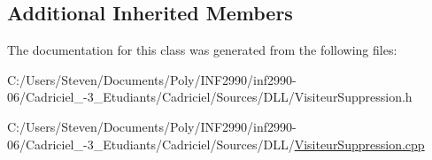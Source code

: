 \subsection*{Additional Inherited Members}


The documentation for this class was generated from the following files\+:\begin{DoxyCompactItemize}
\item 
C\+:/\+Users/\+Steven/\+Documents/\+Poly/\+I\+N\+F2990/inf2990-\/06/\+Cadriciel\+\_-\/3\+\_\+\+Etudiants/\+Cadriciel/\+Sources/\+D\+L\+L/Visiteur\+Suppression.\+h\item 
C\+:/\+Users/\+Steven/\+Documents/\+Poly/\+I\+N\+F2990/inf2990-\/06/\+Cadriciel\+\_-\/3\+\_\+\+Etudiants/\+Cadriciel/\+Sources/\+D\+L\+L/\hyperlink{_visiteur_suppression_8cpp}{Visiteur\+Suppression.\+cpp}\end{DoxyCompactItemize}
